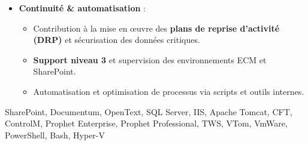 \begin{experiences}
{\begin{itemize}[left=0pt,label={},itemsep=0.4em]
          \item \textbf{Continuité \& automatisation } :
            \begin{itemize}[itemsep=0.15em,topsep=0.1em,parsep=0pt]
              \small
              \item Contribution à la mise en œuvre des \textbf{plans de reprise d’activité (DRP)} et sécurisation des données critiques.
              \item \textbf{Support niveau 3} et supervision des environnements ECM et SharePoint.
              \item Automatisation et optimisation de processus via scripts et outils internes.
            \end{itemize}
        \end{itemize}
        \vspace{0.3em}
    }
    {SharePoint, Documentum, OpenText, SQL Server, IIS, Apache Tomcat, CFT, ControlM, Prophet Enterprise, Prophet Professional, TWS, VTom, VmWare, PowerShell, Bash, Hyper-V}
\emptySeparator



\end{experiences}

